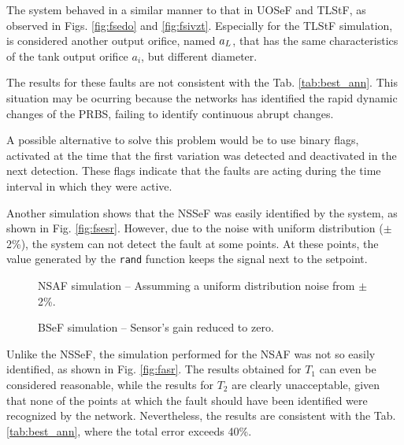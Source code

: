\documentclass[10pt,fleqn,a4paper]{article}
\begin{document}
The system behaved in a similar manner to that in UOSeF and TLStF, as observed
in Figs. \ref{fig:fsedo} and \ref{fig:fsivzt}. Especially for the TLStF
simulation, is considered another output orifice, named $a_{\tiny L}$, that has
the same characteristics of the tank output orifice $a_i$, but different
diameter.

The results for these faults are not consistent with the Tab.
\ref{tab:best_ann}. This situation may be ocurring because the networks has
identified the rapid dynamic changes of the PRBS, failing to identify continuous
abrupt changes.

A possible alternative to solve this problem would be to use binary flags,
activated at the time that the first variation was detected and deactivated in
the next detection. These flags indicate that the faults are acting during the
time interval in which they were active.

Another simulation shows that the NSSeF was easily identified by the system, as
shown in Fig. \ref{fig:fsesr}. However, due to the noise with uniform
distribution ($\pm$2\%), the system can not detect the fault at some points. At
these points, the value generated by the {\tt rand} function keeps the signal
next to the setpoint.

\begin{figure}[htb]
    \begin{minipage}[b]{0.48\linewidth}
        \scalebox{0.65}{}
        \vspace{0.5cm}
        \caption{NSAF simulation -- Assumming a uniform distribution noise from
                 $\pm$2\%.}
        \label{fig:fasr}
    \end{minipage}
    \hfill
    \begin{minipage}[b]{0.48\linewidth}
        \scalebox{0.65}{}
        \vspace{0.5cm}
        \caption{BSeF simulation -- Sensor's gain reduced to zero.}
        \label{fig:fseq}
    \end{minipage}
\end{figure}

Unlike the NSSeF, the simulation performed for the NSAF was not so easily
identified, as shown in Fig. \ref{fig:fasr}. The results obtained for $T_1$ can
even be considered reasonable, while the results for $T_2$ are clearly
unacceptable, given that none of the points at which the fault should have been
identified were recognized by the network. Nevertheless, the results are
consistent with the Tab. \ref{tab:best_ann}, where the total error exceeds 40\%.
\end{document}
